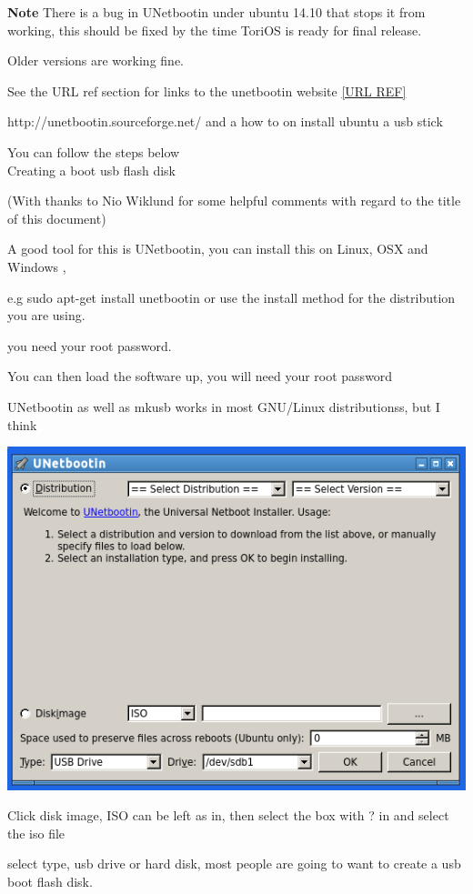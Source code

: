 \documentclass[12pt,a4paper]{book}
\begin{document}
\textbf{Note} There is a bug in UNetbootin under ubuntu 14.10 that stops it from working,  this should be fixed by the time ToriOS is ready for final release. 

Older versions are working fine.

See the URL ref section for links to the unetbootin website \ref{URL REF}

http://unetbootin.sourceforge.net/ \cite{unetbootin} and a how to on install ubuntu a usb stick \cite{unetbootin2}

You can follow the steps below \\

Creating a boot usb flash disk

(With thanks to Nio Wiklund for some helpful comments with regard to the title of this document)

A good tool for this is UNetbootin, \cite{unetbootin}  you can install this on Linux, OSX and Windows ,

e.g sudo apt-get install unetbootin or use the install method for the distribution you are using. 

you need your root password.

You can then load the software up, you will need your root password

UNetbootin as well as mkusb works in most GNU/Linux distributionss, but I think

\newpage




\begin{center}
\includegraphics[width=0.7\linewidth]{unetbootin} 
\end{center}

Click disk image,  ISO can be left as in,  then select the box with ? in and select the iso file

select type, usb drive or hard disk,  most people are going to want to create a usb boot flash disk.
\end{document}
